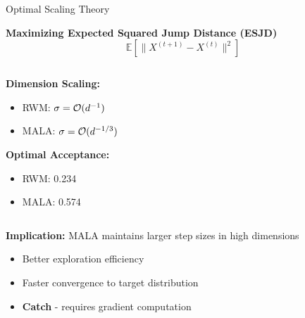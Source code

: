 \documentclass[aspectratio=169]{beamer}
\begin{document}
\begin{frame}{Optimal Scaling Theory}

\begin{center}
\large
\textbf{Maximizing Expected Squared Jump Distance (ESJD)}
$$\mathbb{E}\left[\|X^{(t+1)} - X^{(t)}\|^2\right]$$
\end{center}


\begin{columns}
\begin{column}{0.46\textwidth}
\textbf{Dimension Scaling:}
\begin{itemize}
    \item RWM: $\sigma = \mathcal{O}(d^{-1})$
    \item \textcolor{copenhagenred}{MALA: $\sigma = \mathcal{O}(d^{-1/3})$}
\end{itemize}

\vspace{0.5em}

\textbf{Optimal Acceptance:}
\begin{itemize}
    \item RWM: 0.234
    \item \textcolor{copenhagenred}{MALA: 0.574}
\end{itemize}
\end{column}
\begin{column}{0.46\textwidth}
\end{column}
\end{columns}

\vspace{1em}

\textbf{Implication:} MALA maintains larger step sizes in high dimensions
\begin{itemize}
    \item Better exploration efficiency
    \item Faster convergence to target distribution
    \item \textbf{Catch} - requires gradient computation
\end{itemize}
\end{frame}
\end{document}
